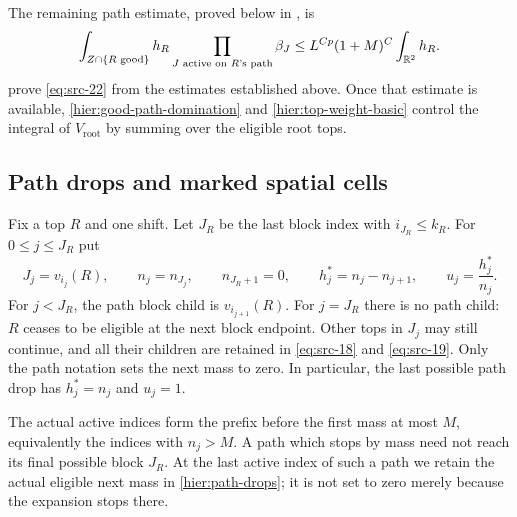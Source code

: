 The remaining path estimate, proved below in
, is
\begin{equation}
 \int_{Z\cap\{R\text{ good}\}}
       h_R\prod_{J\text{ active on }R\text{'s path}}\beta_J
 \le L^{Cp}(1+M)^C\int_{\mathbb R^2}h_R.
 \label{eq:src-22}
\end{equation}
 prove \eqref{eq:src-22} from the
estimates established above.  Once that estimate is available,
\eqref{hier:good-path-domination} and
\eqref{hier:top-weight-basic} control the integral of
$V_{\mathrm{root}}$ by summing over the eligible root tops.

\subsection{Path drops and marked spatial cells}

Fix a top $R$ and one shift.  Let $J_R$ be the last block index with
$i_{J_R}\le k_R$.  For $0\le j\le J_R$ put
\begin{equation}
 J_j=v_{i_j}(R),\qquad n_j=n_{J_j},\qquad
 n_{J_R+1}=0,\qquad
 h_j^*=n_j-n_{j+1},\qquad u_j=\frac{h_j^*}{n_j}.
 \label{hier:path-drops}
\end{equation}
For $j<J_R$, the path block child is $v_{i_{j+1}}(R)$.
For $j=J_R$ there is no path child: $R$ ceases to be eligible at the
next block endpoint.  Other tops in $J_j$ may still continue, and all
their children are retained in \eqref{eq:src-18} and
\eqref{eq:src-19}.  Only the path notation sets the next mass to zero.
In particular, the last possible path drop has $h_j^*=n_j$ and $u_j=1$.

The actual active indices form the prefix before the first mass at most
$M$, equivalently the indices with $n_j>M$.  A path which stops by mass
need not reach its final possible block $J_R$.  At the last active
index of such a path we retain the actual eligible next mass in
\eqref{hier:path-drops}; it is not set to zero merely because the
expansion stops there.

